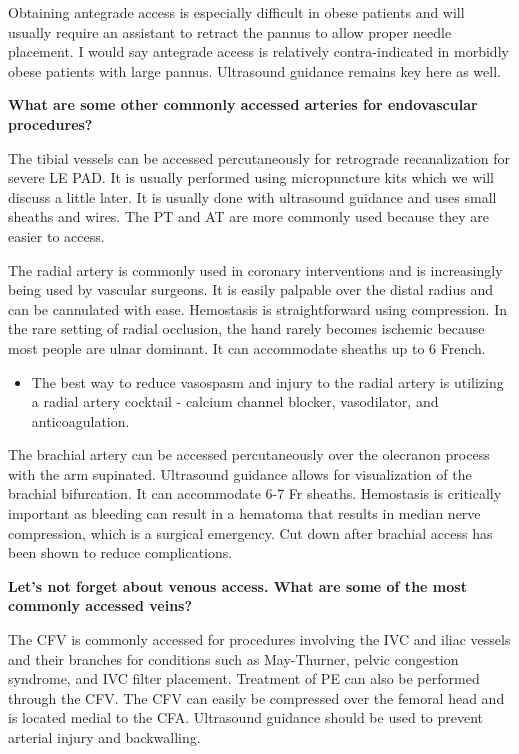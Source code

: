 \documentclass[
]{book}
\providecommand{\tightlist}{%
  \setlength{\itemsep}{0pt}\setlength{\parskip}{0pt}}
\begin{document}
Obtaining antegrade access is especially difficult in obese patients and
will usually require an assistant to retract the pannus to allow proper
needle placement. I would say antegrade access is relatively
contra-indicated in morbidly obese patients with large pannus.
Ultrasound guidance remains key here as well.

\textbf{What are some other commonly accessed arteries for endovascular
procedures?}

The tibial vessels can be accessed percutaneously for retrograde
recanalization for severe LE PAD. It is usually performed using
micropuncture kits which we will discuss a little later. It is usually
done with ultrasound guidance and uses small sheaths and wires. The PT
and AT are more commonly used because they are easier to access.

The radial artery is commonly used in coronary interventions and is
increasingly being used by vascular surgeons. It is easily palpable over
the distal radius and can be cannulated with ease. Hemostasis is
straightforward using compression. In the rare setting of radial
occlusion, the hand rarely becomes ischemic because most people are
ulnar dominant. It can accommodate sheaths up to 6 French.

\begin{itemize}
\tightlist
\item
  The best way to reduce vasospasm and injury to the radial artery is
  utilizing a radial artery cocktail - calcium channel blocker,
  vasodilator, and anticoagulation.\citep{mason2018, cauley2019}
\end{itemize}

The brachial artery can be accessed percutaneously over the olecranon
process with the arm supinated.\citep{alvarez-tostado2009} Ultrasound
guidance allows for visualization of the brachial bifurcation. It can
accommodate 6-7 Fr sheaths. Hemostasis is critically important as
bleeding can result in a hematoma that results in median nerve
compression, which is a surgical emergency. Cut down after brachial
access has been shown to reduce complications.\citep{kret2016}

\textbf{Let's not forget about venous access. What are some of the most
commonly accessed veins?}

The CFV is commonly accessed for procedures involving the IVC and iliac
vessels and their branches for conditions such as May-Thurner, pelvic
congestion syndrome, and IVC filter placement. Treatment of PE can also
be performed through the CFV. The CFV can easily be compressed over the
femoral head and is located medial to the CFA. Ultrasound guidance
should be used to prevent arterial injury and backwalling.
\end{document}
